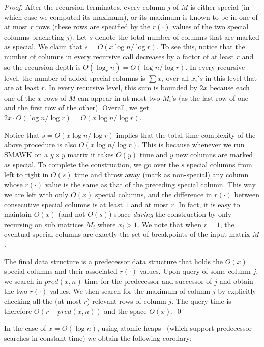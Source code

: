 \documentclass{llncs}
\begin{document}
\begin{proof}
After the recursion terminates, every column $j$ of $M$ is either
special (in which case we computed its maximum), or its maximum  is
known to be in one of at most $r$ rows (these rows are specified by the $r(\cdot)$
values of the two special columns bracketing $j$). 
Let $s$ denote the total number of columns that are marked as special. 
We claim that $s = O(x \log n /\log r)$. To see this, notice that the
number of columns in every recursive call decreases by a factor of at
least $r$ and so the recursion depth is $O(\log_r n) = O(\log n /\log
r)$. In every recursive level, the number of added special columns is
$\sum x_i$ over all $x_i's$ in this level that are at least $r$. In
every recursive level, this sum is bounded by $2x$ because each one of
the $x$ rows of $M$ can appear in at most two $M_i$'s  (as the last
row of one and the first row of the other). Overall, we get $2x \cdot
O(\log n /\log r) = O(x \log n /\log r)$. 

Notice that $s = O(x \log n /\log r)$ implies that the total time
complexity of the above procedure is also $O(x \log n /\log r)$. This
is because whenever we run SMAWK on a $y \times y$ matrix it takes
$O(y)$ time and $y$ new columns are marked as special.  To complete
the construction, we go over the $s$ special columns from left to right in
$O(s)$ time and throw away (mark as non-special) any column whose
$r(\cdot)$ value is the same as that of the preceding special column. This
way we are left with only $O(x)$ special columns, and the difference in
$r(\cdot)$ between consecutive special columns is at least $1$ and at most
$r$. In fact, it is easy to maintain $O(x)$ (and not $O(s)$) space
{\em during} the construction by only recursing on sub matrices $M_i$
where $x_i >1$. We note that when $r=1$, the eventual special columns are
exactly the set of breakpoints of the input matrix $M$.

The final data structure is a predecessor data structure that holds
the $O(x)$ special columns and their associated $r(\cdot)$
values. Upon query of some column $j$, we search in $pred(x,n)$ time
for the predecessor and successor of $j$ and obtain the two $r(\cdot)$
values. We then  search for the maximum of column $j$ by explicitly
checking all the (at most $r$) relevant rows of column $j$. The query time is
therefore  $O(r+pred(x,n))$ and the space $O(x)$.  
\qed \end{proof}

 

In the case of $x = O(\log n)$, using atomic heaps~\cite{FredmanW94} (which support
predecessor searches in constant time) we obtain the following corollary:
\end{document}
